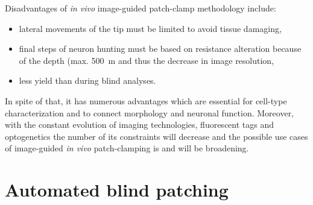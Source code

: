 \documentclass[12pt,a4paper]{report}
\begin{document}
Disadvantages of \textit{in vivo} image-guided patch-clamp methodology include:
\begin{itemize}
    \item lateral movements of the tip must be limited to avoid tissue damaging,
    \item final steps of neuron hunting must be based on resistance alteration because of the depth (max. 500~\textmu m and thus the decrease in image resolution,
    \item less yield than during blind analyses.
\end{itemize}
In spite of that, it has numerous advantages which are essential for cell-type characterization and to connect morphology and neuronal function. Moreover, with the constant evolution of imaging technologies, fluorescent tags and optogenetics the number of its constraints will decrease and the possible use cases of image-guided \textit{in vivo} patch-clamping is and will be broadening.

\chapter{Automated blind patching}
\end{document}
